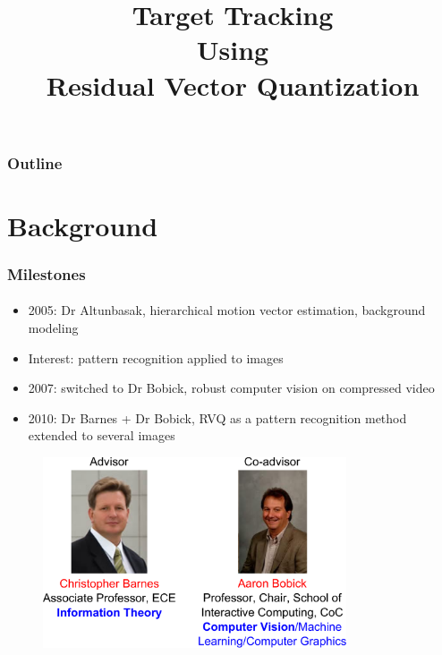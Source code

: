 
\title{Target Tracking \\ Using \\Residual Vector Quantization}
\begin{frame}[plain]\logoCSIPCPL\logoTechTower
	\titlepage
\end{frame}

\begin{frame}
\frametitle{Outline}
\logoCSIPCPL\logoTechTower
	\setcounter{tocdepth}{2}	
	\tableofcontents
\end{frame}

\section{Background}
\begin{frame}
\frametitle{Milestones}
\framesubtitle{}
\logoCSIPCPL\mypagenum
\vspace{0.2in}
\begin{itemize}
\item 2005: Dr Altunbasak, hierarchical motion vector estimation, background modeling
\item {\color{blue}Interest}: pattern recognition applied to images
\item 2007: switched to Dr Bobick, robust computer vision on compressed video
\item 2010: Dr Barnes + Dr Bobick, RVQ as a pattern recognition method extended to several images
\end{itemize}
\begin{figure}
\includegraphics[width=0.8\textwidth]{thesis/professors.pdf}
\end{figure}
\end{frame}

